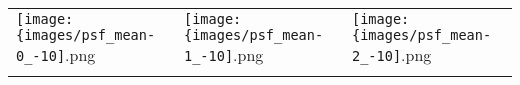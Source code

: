  \begin{tabular}{lll}
\texttt{[image: \{images/psf\_mean-0\_-10]}.png} &\texttt{[image: \{images/psf\_mean-1\_-10]}.png} &\texttt{[image: \{images/psf\_mean-2\_-10]}.png} 
 \\ \hfill\end{tabular}